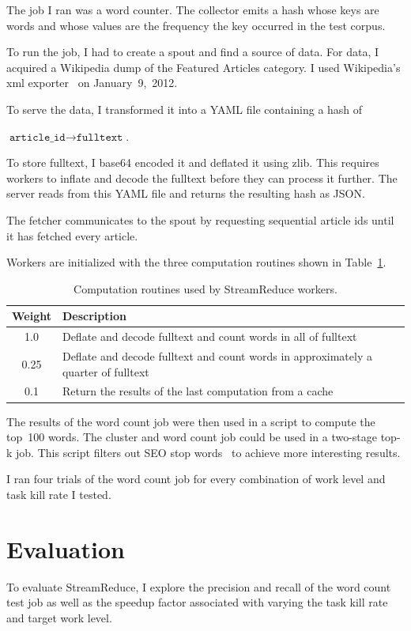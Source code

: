 \documentclass[12pt,twocolumn]{article}
\begin{document}
The job I ran was a word counter. The collector emits a hash whose keys are words and
whose
values are the frequency the key occurred in the test corpus.

To run the job, I had to create a spout and find a source of data. For data, I acquired a
Wikipedia dump of the Featured Articles category. I used Wikipedia's xml
exporter~\cite{wikipedia:special:export} on January~9,~2012.

To serve the data, I transformed it into a YAML file containing a hash of
\begin{center}
$\texttt{article\_id}\rightarrow\texttt{fulltext}$.
\end{center}
To store fulltext, I base64 encoded it and
deflated it using zlib. This requires workers to inflate and decode the fulltext before they
can process it further. The server reads from this YAML file and returns the resulting hash as
JSON.

The fetcher communicates to the spout by requesting sequential article ids until it has
fetched
every article.

Workers are initialized with the three computation routines shown in
Table~\ref{table:workerTasks}.

\begin{table}
\begin{tabularx}{\linewidth}{|c|X|}
 \hline
Weight & Description \\ \hline
1.0 & Deflate and decode fulltext and count words in all of fulltext \\ \hline
0.25 & Deflate and decode fulltext and count words in approximately a quarter of fulltext \\
\hline
0.1 & Return the results of the last computation from a cache \\ \hline
\end{tabularx}
\caption{Computation routines used by StreamReduce workers.}
\label{table:workerTasks}
\end{table}

The results of the word count job were then used in a script to compute the top~100 words.
The cluster and word count job could be used in a two-stage top-k job. This script filters
out SEO stop words~\cite{stopwords} to achieve more interesting results.

I ran four trials of the word count job for every combination of work level and task kill
rate I tested.

\section{Evaluation}
\label{sec:evaluation}
To evaluate StreamReduce, I explore the precision and recall of the word count test job as
well as the
speedup factor associated with varying the task kill rate and target work level.
\end{document}
